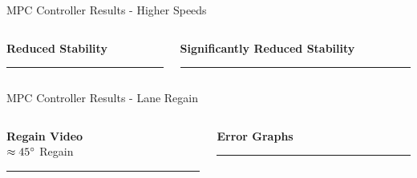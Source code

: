 \documentclass[aspectratio=169,12pt]{beamer}
\begin{document}
\begin{frame}[t]{MPC Controller Results - Higher Speeds}
  \begin{columns}[T]
    \begin{column}{0.5\textwidth}
      \centering
      \textbf{Reduced Stability} \\
      \vspace{0.3em}
      \rule{0pt}{5cm}\rule{0.9\linewidth}{0pt} %
    \end{column}

    \begin{column}{0.5\textwidth}
      \centering
      \textbf{Significantly Reduced Stability} \\
      \vspace{0.3em}
      \rule{0pt}{5cm}\rule{0.9\linewidth}{0pt} %
    \end{column}
  \end{columns}

\end{frame}

\begin{frame}[t]{MPC Controller Results - Lane Regain}
  \begin{columns}[T]
    \begin{column}{0.5\textwidth}
      \centering
      \textbf{Regain Video} \\
      \(\approx 45 \degree \) Regain
      \vspace{0.3em}
      \rule{0pt}{5cm}\rule{0.9\linewidth}{0pt} %
    \end{column}

    \begin{column}{0.5\textwidth}
      \centering
      \textbf{Error Graphs} \\
      \vspace{0.3em}
      \rule{0pt}{5cm}\rule{0.9\linewidth}{0pt} %
    \end{column}
  \end{columns}
\end{frame}
\end{document}
